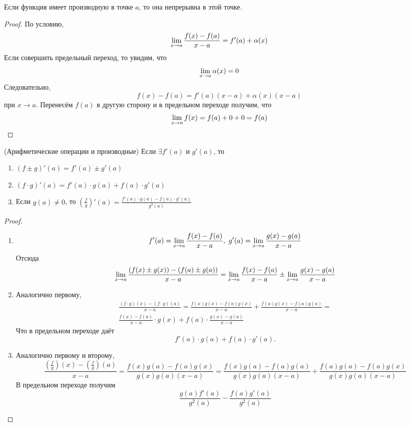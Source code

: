 \begin{theorem}
	Если функция имеет производную в точке $a$, то она непрерывна в этой точке.
\end{theorem}

\begin{proof}
	По условию,
	$$
		\lim\limits_{x \to a} \frac{f(x) - f(a)}{x - a} = f'(a) + \alpha(x)
	$$
	Если совершить предельный переход, то увидим, что
	$$
		\lim\limits_{x \to a} \alpha(x) = 0
	$$
	Следовательно,
	$$
		f(x) - f(a) = f'(a)(x - a) + \alpha(x)(x - a)
	$$
	при $x \to a$. Перенесём $f(a)$ в другую сторону и в предельном переходе получим, что
	$$
		\lim\limits_{x \to a} f(x) = f(a) + 0 + 0 = f(a)
	$$
\end{proof}

\begin{theorem} (Арифметические операции и производные)
	Если $\exists f'(a)$ и $g'(a)$, то
	\begin{enumerate}
		\item $(f \pm g)'(a) = f'(a) \pm g'(a)$
		
		\item $(f \cdot g)'(a) = f'(a) \cdot g(a) + f(a) \cdot g'(a)$
		
		\item Если $g(a) \neq 0$, то $\left(\frac{f}{g}\right)'(a) = \frac{f'(a) \cdot g(a) - f(a) \cdot g'(a)}{g^2(a)}$
	\end{enumerate}
\end{theorem}

\begin{proof}~
	\begin{enumerate}
		\item 
		$$
			f'(a) = \lim\limits_{x \to a} \frac{f(x) - f(a)}{x - a},\ g'(a) = \lim\limits_{x \to a} \frac{g(x) - g(a)}{x - a}
		$$
		Отсюда
		$$
			\lim\limits_{x \to a} \frac{(f(x) \pm g(x)) - (f(a) \pm g(a))}{x - a} = \lim\limits_{x \to a} \frac{f(x) - f(a)}{x - a} \pm \lim\limits_{x \to a} \frac{g(x) - g(a)}{x - a}
		$$
		
		\item Аналогично первому,
		\begin{multline*}
			\frac{(f \cdot g)(x) - (f \cdot g)(a)}{x - a} = \frac{f(x)g(x) - f(a)g(x)}{x - a} + \frac{f(a)g(x) - f(a)g(a)}{x - a} = \\
			\frac{f(x) - f(a)}{x - a} \cdot g(x) + f(a) \cdot \frac{g(x) - g(a)}{x - a}
		\end{multline*}
		Что в предельном переходе даёт
		$$
			f'(a) \cdot g(a) + f(a) \cdot g'(a).
		$$
		
		\item Аналогично первому и второму,
		$$
			\frac{(\frac{f}{g})(x) - (\frac{f}{g})(a)}{x - a} = \frac{f(x)g(a) - f(a)g(x)}{g(x)g(a)(x - a)} = \frac{f(x)g(a) - f(a)g(a)}{g(x)g(a)(x - a)} + \frac{f(a)g(a) - f(a)g(x)}{g(x)g(a)(x - a)}
		$$
		В предельном переходе получим
		$$
			\frac{g(a)f'(a)}{g^2(a)} - \frac{f(a)g'(a)}{g^2(a)}
		$$
	\end{enumerate}
\end{proof}

